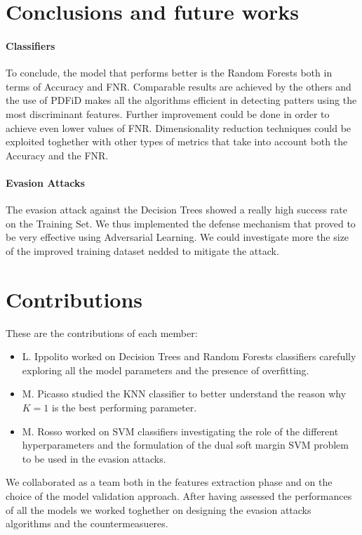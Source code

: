 \documentclass[twocolumn, switch]{article} %
\begin{document}
\section{Conclusions and future works}
\label{sec:conclusions}
\paragraph{Classifiers}
To conclude, the model that performs better is the Random Forests both in terms of Accuracy and FNR. Comparable results are achieved by the others and the use of PDFiD makes all the algorithms efficient in detecting patters using the most discriminant features. Further improvement could be done in order to achieve even lower values of FNR. Dimensionality reduction techniques could be exploited toghether with other types of metrics that take into account both the Accuracy and the FNR.
\vspace{-10pt}
\paragraph{Evasion Attacks}
The evasion attack against the Decision Trees showed a really high success rate on the Training Set. We thus implemented the defense mechanism that proved to be very effective using Adversarial Learning. We could investigate more the size of the improved training dataset nedded to mitigate the attack.

\section{Contributions}
\label{sec:contributions}
These are the contributions of each member:
\begin{itemize}
	\item L. Ippolito worked on Decision Trees and Random Forests classifiers carefully exploring all the model parameters and the presence of overfitting.
	\item M. Picasso studied the KNN classifier to better understand the reason why $K=1$ is the best performing parameter.
	\item M. Rosso worked on SVM classifiers investigating the role of the different hyperparameters and the formulation of the dual soft margin SVM problem to be used in the evasion attacks.
\end{itemize}
We collaborated as a team both in the features extraction phase and on the choice of the model validation approach. After having assessed the performances of all the models we worked toghether on designing the evasion attacks algorithms and the countermeasueres.
\end{document}
